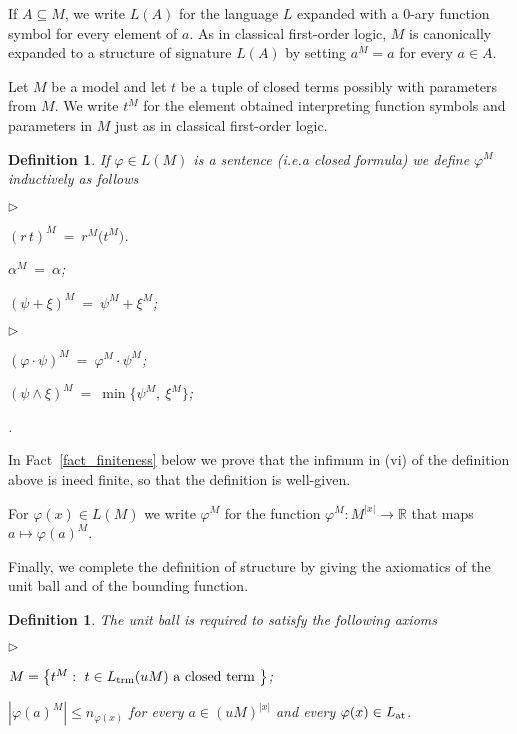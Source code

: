 \documentclass[12pt,letterpaper,oneside,reqno]{amsart}
\newcommand{\mylabel}[1]{{#1}\hfill}
\renewenvironment{itemize}
  {\begin{list}{$\triangleright$}{%
   \setlength{\parskip}{0mm}
   \setlength{\topsep}{.2\baselineskip}
   \setlength{\rightmargin}{0mm}
   \setlength{\listparindent}{0mm}
   \setlength{\itemindent}{0mm}
   \setlength{\labelwidth}{3ex}
   \setlength{\itemsep}{.2\baselineskip}
   \setlength{\parsep}{.2\baselineskip}
   \setlength{\partopsep}{0mm}
   \setlength{\labelsep}{1ex}
   \setlength{\leftmargin}{\labelwidth+\labelsep}
   \let\makelabel\mylabel}}{%
   \end{list}}
\theoremstyle{plain}
\newtheorem{definition}[theorem]{Definition}
\theoremstyle{remark}
\begin{document}
If $A\subseteq M$, we write $L(A)$ for the language $L$ expanded with a $0$-ary function symbol for every element of $a$.
As in classical first-order logic, $M$ is canonically expanded to a structure of signature $L(A)$ by setting $a^M=a$ for every $a\in A$.

Let $M$ be a model and let $t$ be a tuple of closed terms possibly with parameters from $M$.
We write $t^M$ for the element obtained interpreting function symbols and parameters in $M$ just as in classical first-order logic.

\begin{definition}\label{def_semantic}
If $\varphi\in L(M)$ is a sentence (i.e.\@ a closed formula) we define $\varphi^M$ inductively as follows

\begin{minipage}[t]{.5\textwidth}
\begin{itemize}
\item[i.] $(r\,t)^M\ =\  r^M\big(t^M\big)$.
\item[ii.] $\alpha^M\ =\ \alpha$;
\item[iii.] $(\psi+\xi)^M\ =\ \psi^M+\xi^M$;
\end{itemize}
\end{minipage}
\begin{minipage}[t]{.4\textwidth}
\begin{itemize}
\item[iv.] $(\varphi\cdot\psi)^M\ =\ \varphi^M\cdot\psi^M$;
\item[v.] $(\psi\wedge\xi)^M\ =\ \min\big\{\psi^M,\ \xi^M\big\}$; 
\item[vi.] \noindent{}.
\end{itemize}
\end{minipage}
\end{definition}
\medskip

In Fact~\ref{fact_finiteness} below we prove that the infimum in (vi) of the definition above is ineed finite, so that the definition is well-given.

For $\varphi(x)\in L(M)$ we write $\varphi^M$ for the function $\varphi^M:M^{|x|}\to{\mathds R}$ that maps $a\mapsto\varphi(a)^M$.

Finally, we complete the definition of structure by giving the axiomatics of the unit ball and of the bounding function.

\begin{definition}\label{def_unitball}
  The unit ball is required to satisfy the following axioms 
  \begin{itemize}
  \item[1.] $M=\big\{t^M:\ t\in L_{\rm trm}(uM) \textrm{ a closed term }\big\}$;
  \item[2.] $|\varphi(a)^M|\le n_{\varphi(x)}$ for every $a\in (uM)^{|x|}$ and every $\varphi(x)\in L_{\rm at}$.
  \end{itemize}
\end{definition}
\end{document}

